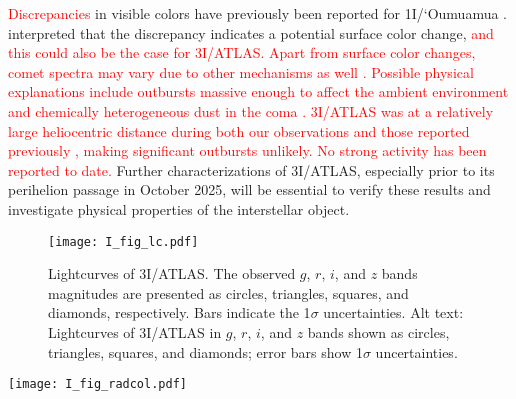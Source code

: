 \documentclass[]{pasj02}
\newcommand{\RED}[1]{\textcolor{red}{#1}}
\newcommand\I{3I/ATLAS\xspace}
\begin{document}
\RED{
    Discrepancies
}
    in visible colors have previously been reported for 1I/`Oumuamua \citep{Meech2017, Jewitt2017, Bannister2017}.
    \citet{Bannister2017} interpreted that the discrepancy indicates a potential surface color change,
\RED{
    and this could also be the case for \I.
    Apart from surface color changes, comet spectra may vary due to other mechanisms as well \citep[][and references therein]{Jewitt2015}.
    Possible physical explanations include outbursts
    massive enough to affect the ambient environment \citep[e.g.,][]{Yang2009}
    and chemically heterogeneous dust in the coma \citep{Ivanova2017}.
    \I was at a relatively large heliocentric distance 
    during both our observations and those reported previously \citep{Seligman2025_3I, Bolin2025_3I}, 
    making significant outbursts unlikely.
    No strong activity has been reported to date.
}
Further characterizations of \I, especially prior to its perihelion passage in October 2025, will be essential to verify these results and investigate physical properties of the interstellar object.

\begin{figure}
 \begin{center}
  \texttt{[image: I\_fig\_lc.pdf]} 
 \end{center}
\caption{
    Lightcurves of \I.
    The observed $g$, $r$, $i$, and $z$ bands magnitudes 
    are presented as circles, triangles, squares, and diamonds, respectively.
    Bars indicate the 1$\sigma$ uncertainties.
    {Alt text: Lightcurves of \I in $g$, $r$, $i$, and $z$ bands shown as circles, triangles, squares, and diamonds; error bars show 1$\sigma$ uncertainties.} 
}\label{fig:lc}
\end{figure}

\begin{figure*}
 \begin{center}
  \texttt{[image: I\_fig\_radcol.pdf]} 
 \end{center}
\caption{
    Color indices of \I as a function of aperture radius. 
    The median and standard deviation of the estimated colors are indicated by circles, while the nominal colors are marked with stars.
    Color indices remain nearly constant across aperture sizes from 5 to 12 pixels, indicating robustness of color measurement against aperture size.
    {Alt text: 
    Color indices ($g - r$, $r - i$, $r - z$) of \I vs. aperture radius. Circles indicate median values with standard deviation, stars indicate nominal values; colors remain stable from 5 to 12 pixels.} 
}\label{fig:radcol}
\end{figure*}
\end{document}
